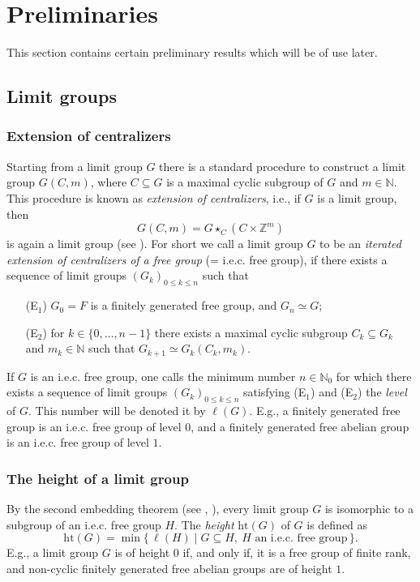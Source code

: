\documentclass[10pt]{amsart}
\theoremstyle{plain}
\theoremstyle{definition}
\theoremstyle{remark}
\numberwithin{prop}{section}
\numberwithin{example}{section}
\numberwithin{equation}{section}
\newcommand{\Z}{\mathbb{Z}}
\newcommand{\N}{\mathbb{N}}
\newcommand{\het}{\mathrm{ht}}
\begin{document}
	\section{Preliminaries}
	This section contains certain preliminary results which will be of use later. 
	\subsection{Limit groups}

\subsubsection{Extension of centralizers}
	\label{ss:et}
	Starting from a limit group $G$ there is a standard procedure
	to construct a limit group $G(C,m)$, where $C\subseteq G$ is a maximal cyclic subgroup
	of $G$ and $m\in\N$. This procedure is known as {\em extension of centralizers}, i.e., if $G$ is a limit group, then
	\begin{equation}
	\label{eq:excen}
	G(C,m)=G\star_C(C\times\Z^m)
	\end{equation}
	is again a limit group (see \cite[Lemma 2 and Thm.~4]{KM2}).
	For short we call a limit group $G$ to be an {\em iterated extension of centralizers of a free group} (= i.e.c. free group),
	if there exists a sequence of limit groups $(G_k)_{0\leq k\leq n}$ such that
	\begin{itemize}
		\item[(E$_1$)] $G_0=F$ is a finitely generated free group, and $G_n\simeq G$;
		\item[(E$_2$)] for $k\in\{0,\ldots,n-1\}$ there exists a maximal cyclic subgroup $C_k\subseteq G_k$ and
		$m_k\in\N$ such that $G_{k+1}\simeq G_k(C_k,m_k)$.  
	\end{itemize}
	If $G$ is an i.e.c. free group, one calls the minimum number $n\in\N_0$ for which there exists
	a sequence of limit groups $(G_k)_{0\leq k\leq n}$ satisfying (E$_1$) and (E$_2$) the {\em level} of $G$.
	This number will be denoted it by $\ell(G)$. E.g., a finitely generated free group is an i.e.c. free group of level $0$, and a finitely generated free abelian group is an
	i.e.c. free group of level $1$.
	
	\subsubsection{The height of a limit group}
	\label{ss:hgt}
	By the second embedding theorem (see \cite[\S 2.3, Thm.~2]{KMRS}, \cite[Thm.~4]{KM2}), every limit group $G$ is isomorphic to a subgroup
	of an i.e.c. free group $H$. The {\em height} $\het(G)$ of $G$ is defined as
	\begin{equation}
	\label{eq:defht}
	\het(G)=\min\{\,\ell(H)\mid G\subseteq H,\ \text{$H$ an i.e.c. free group}\,\}.
	\end{equation}
	E.g., a limit group $G$ is of height $0$ if, and only if, it is a free group of finite rank,
	and non-cyclic finitely generated free abelian groups are of height $1$.
	
\end{document}

